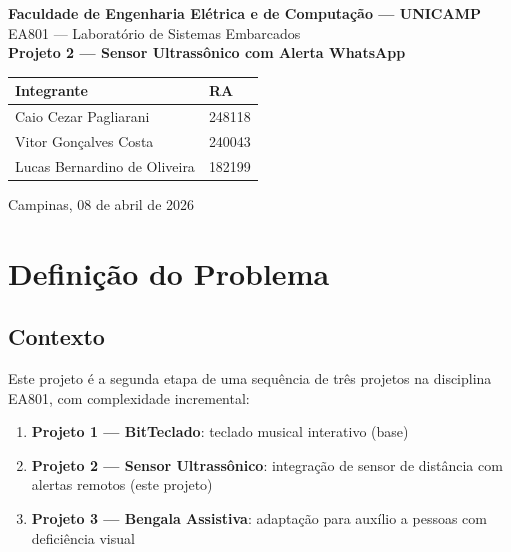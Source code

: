 \documentclass[12pt, a4paper]{article}
\newcommand{\projetotitulo}{Projeto 2 --- Sensor Ultrassônico com Alerta WhatsApp}
\newcommand{\disciplina}{EA801 --- Laboratório de Sistemas Embarcados}
\newcommand{\instituicao}{Faculdade de Engenharia Elétrica e de Computação --- UNICAMP}
\begin{document}
\begin{titlepage}
  \centering
  \vspace*{2cm}

  {\Large \textbf{\instituicao}}\\[0.5cm]
  {\large \disciplina}\\[3cm]

  {\LARGE \textbf{\projetotitulo}}\\[3cm]

  \begin{tabular}{ll}
    \toprule
    \textbf{Integrante} & \textbf{RA} \\
    \midrule
    Caio Cezar Pagliarani & 248118 \\
    Vitor Gonçalves Costa & 240043 \\
    Lucas Bernardino de Oliveira & 182199 \\
    \bottomrule
  \end{tabular}

  \vfill
  {\large Campinas, 08 de abril de 2026}
\end{titlepage}

\tableofcontents
\newpage

\section{Definição do Problema}
\label{sec:problema}

\subsection{Contexto}

Este projeto é a segunda etapa de uma sequência de três projetos na disciplina EA801, com complexidade incremental:

\begin{enumerate}
  \item \textbf{Projeto 1 --- BitTeclado}: teclado musical interativo (base)
  \item \textbf{Projeto 2 --- Sensor Ultrassônico}: integração de sensor de distância com alertas remotos (este projeto)
  \item \textbf{Projeto 3 --- Bengala Assistiva}: adaptação para auxílio a pessoas com deficiência visual
\end{enumerate}
\end{document}
